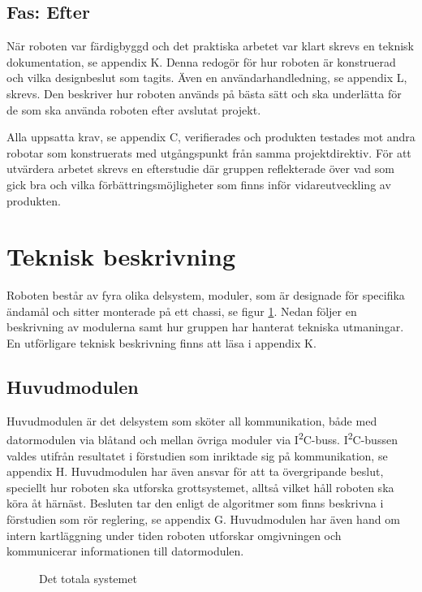 \documentclass[11pt]{article}
\begin{document}
\begin{flushleft}
\subsection{Fas: Efter}
När roboten var färdigbyggd och det praktiska arbetet var klart skrevs en teknisk dokumentation, se appendix K. Denna redogör för hur roboten är konstruerad och vilka designbeslut som tagits. Även en användarhandledning, se appendix L, skrevs. Den beskriver hur roboten används på bästa sätt och ska underlätta för de som ska använda roboten efter avslutat projekt.

Alla uppsatta krav, se appendix C, verifierades och produkten testades mot andra robotar som konstruerats med utgångspunkt från samma projektdirektiv. För att utvärdera arbetet skrevs en efterstudie där gruppen reflekterade över vad som gick bra och vilka förbättringsmöjligheter som finns inför vidareutveckling av produkten.

\pagebreak

\section{Teknisk beskrivning}
Roboten består av fyra olika delsystem, moduler, som är designade för specifika ändamål och sitter monterade på ett chassi, se figur \ref{overview}. Nedan följer en beskrivning av modulerna samt hur gruppen har hanterat tekniska utmaningar. En utförligare teknisk beskrivning finns att läsa i appendix K. 


\subsection{Huvudmodulen}
Huvudmodulen är det delsystem som sköter all kommunikation, både med datormodulen via blåtand och mellan övriga moduler via I\textsuperscript{2}C-buss. I\textsuperscript{2}C-bussen valdes utifrån resultatet i förstudien som inriktade sig på kommunikation, se appendix H. Huvudmodulen har även ansvar för att ta övergripande beslut, speciellt hur roboten ska utforska grottsystemet, alltså vilket håll roboten ska köra åt härnäst. Besluten tar den enligt de algoritmer som finns beskrivna i förstudien som rör reglering, se appendix G. Huvudmodulen har även hand om intern kartläggning under tiden roboten utforskar omgivningen och kommunicerar informationen till datormodulen. 

\begin{figure}[!htbp]
\centering
\noindent\resizebox{.7\linewidth}{!}{
	}
	\caption{Det totala systemet \label{overview}}	
\end{figure}


\end{flushleft}
\end{document}
